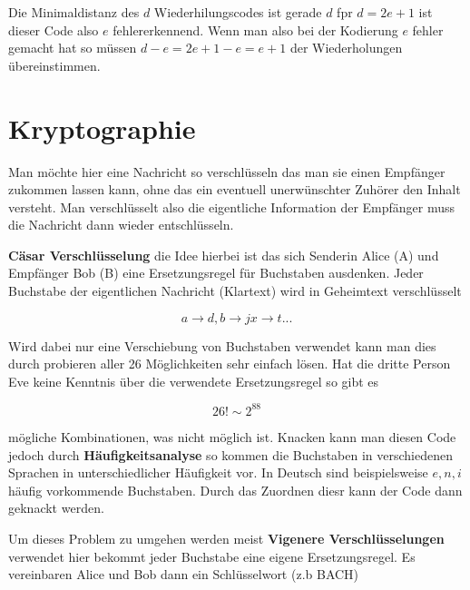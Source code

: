 \documentclass{report}
\begin{document}

Die Minimaldistanz des $d$ Wiederhilungscodes ist gerade $d$ fpr $d=2e+1$ ist dieser Code also $e$ fehlererkennend. Wenn man also bei der Kodierung $e$ fehler gemacht hat so müssen $d-e = 2e+1 - e = e+1$ der Wiederholungen übereinstimmen.



\section{Kryptographie} %
\label{sec:kryptographie}

Man möchte hier eine Nachricht so verschlüsseln das man sie einen Empfänger zukommen lassen kann, ohne das ein eventuell unerwünschter Zuhörer den Inhalt versteht. Man verschlüsselt also die eigentliche Information der Empfänger muss die Nachricht dann wieder entschlüsseln.

\textbf{Cäsar Verschlüsselung} die Idee hierbei ist das sich Senderin Alice (A) und Empfänger Bob (B) eine Ersetzungsregel für Buchstaben ausdenken. Jeder Buchstabe der eigentlichen Nachricht (Klartext) wird in Geheimtext verschlüsselt 

\begin{equation}
    a \to d, b \to j x \to t ... 
\end{equation}

Wird dabei nur eine Verschiebung von Buchstaben verwendet kann man dies durch probieren aller 26 Möglichkeiten sehr einfach lösen. Hat die dritte Person Eve keine Kenntnis über die verwendete Ersetzungsregel so gibt es 

\begin{equation}
    26! \sim 2^{88}
\end{equation}

mögliche Kombinationen, was nicht möglich ist. Knacken kann man diesen Code jedoch durch \textbf{Häufigkeitsanalyse} so kommen die Buchstaben in verschiedenen Sprachen in unterschiedlicher Häufigkeit vor. In Deutsch sind beispielsweise $e, n,i$ häufig vorkommende Buchstaben. Durch das Zuordnen diesr kann der Code dann geknackt werden.

Um dieses Problem zu umgehen werden meist  \textbf{Vigenere Verschlüsselungen} verwendet hier bekommt jeder Buchstabe eine eigene Ersetzungsregel. Es vereinbaren Alice und Bob dann ein Schlüsselwort (z.b BACH)
\end{document}
